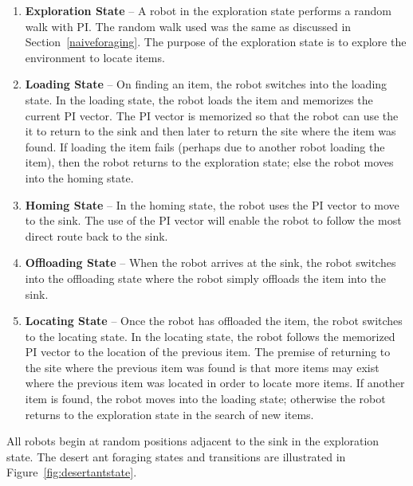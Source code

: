 \begin{enumerate}
	\item\textbf{Exploration State} -- A robot in the exploration state performs a random walk with PI. The random walk used was the same as discussed in Section~\ref{naiveforaging}. The purpose of the exploration state is to explore the environment to locate items. 
	\item\textbf{Loading State} -- On finding an item, the robot switches into the loading state. In the loading state, the robot loads the item and memorizes the current PI vector. The PI vector is memorized so that the robot can use the it to return to the sink and then later to return the site where the item was found. If loading the item fails (perhaps due to another robot loading the item), then the robot returns to the exploration state; else the robot moves into the homing state.
	\item\textbf{Homing State} -- In the homing state, the robot uses the PI vector to move to the sink. The use of the PI vector will enable the robot to follow the most direct route back to the sink.
	\item\textbf{Offloading State} -- When the robot arrives at the sink, the robot switches into the offloading state where the robot simply offloads the item into the sink. 
	\item\textbf{Locating State} -- Once the robot has offloaded the item, the robot switches to the locating state. In the locating state, the robot follows the memorized PI vector to the location of the previous item. The premise of returning to the site where the previous item was found is that more items may exist where the previous item was located in order to locate more items. If another item is found, the robot moves into the loading state; otherwise the robot returns to the exploration state in the search of new items. 
\end{enumerate}

All robots begin at random positions adjacent to the sink in the exploration state. The desert ant foraging states and transitions are illustrated in Figure~\ref{fig:desertantstate}.

